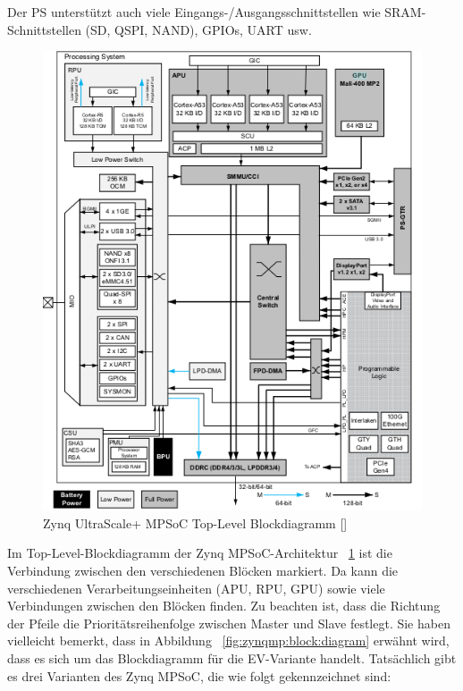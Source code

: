 Der PS unterstützt auch viele Eingangs-/Ausgangsschnittstellen wie SRAM-Schnittstellen (SD, QSPI, NAND), GPIOs, UART usw.

\begin{figure}[h]
	\begin{center}
		\includegraphics[width=1\textwidth]{./images/top-level_zynqmp.jpg}
	\end{center}
	\vspace{-5pt}
	\caption[Zynq UltraScale+ MPSoC Top-Level Blockdiagramm]{Zynq UltraScale+ MPSoC Top-Level Blockdiagramm [\cite{XilinxInc.2019}]} %
	\label{fig:zynqmp:top:level}
	\vspace{-5pt}
\end{figure}
Im Top-Level-Blockdiagramm der Zynq MPSoC-Architektur ~\ref{fig:zynqmp:top:level} ist die Verbindung zwischen den verschiedenen Blöcken markiert. Da kann die verschiedenen Verarbeitungseinheiten (APU, RPU, GPU) sowie viele Verbindungen zwischen den Blöcken finden. Zu beachten ist, dass die Richtung der Pfeile die Prioritätsreihenfolge zwischen Master und Slave festlegt.
Sie haben vielleicht bemerkt, dass in Abbildung ~\ref{fig:zynqmp:block:diagram} erwähnt wird, dass es sich um das Blockdiagramm für die EV-Variante handelt. Tatsächlich gibt es drei Varianten des Zynq MPSoC, die wie folgt gekennzeichnet sind:

